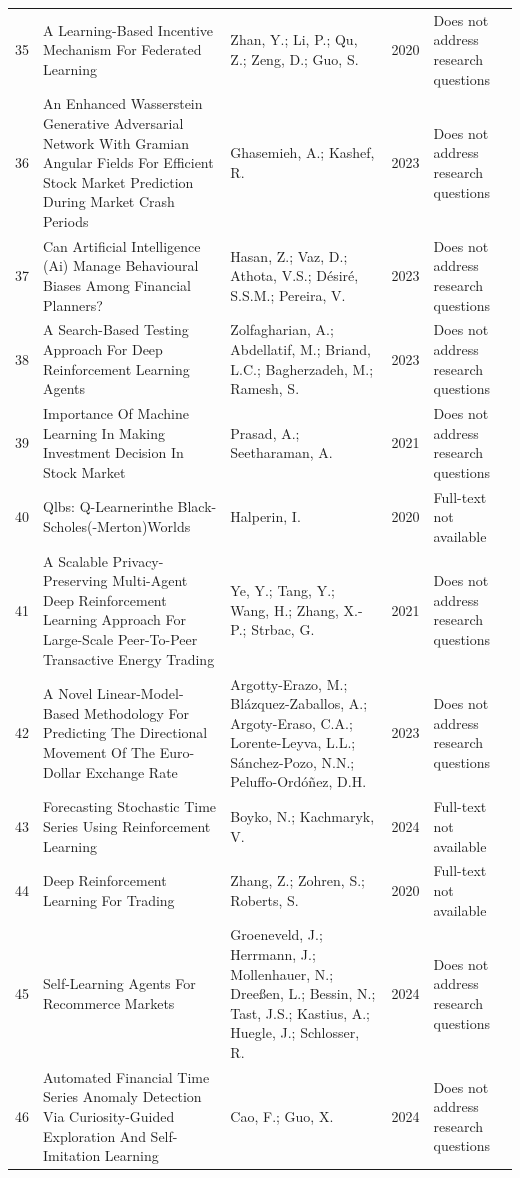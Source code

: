 \begin{small}
\begin{longtable}{r p{5cm} p{4cm} p{1cm} p{5cm}}
35 & A Learning-Based Incentive Mechanism For Federated Learning & Zhan, Y.; Li, P.; Qu, Z.; Zeng, D.; Guo, S. & 2020 & Does not address research questions \\
36 & An Enhanced Wasserstein Generative Adversarial Network With Gramian Angular Fields For Efficient Stock Market Prediction During Market Crash Periods & Ghasemieh, A.; Kashef, R. & 2023 & Does not address research questions \\
37 & Can Artificial Intelligence (Ai) Manage Behavioural Biases Among Financial Planners? & Hasan, Z.; Vaz, D.; Athota, V.S.; Désiré, S.S.M.; Pereira, V. & 2023 & Does not address research questions \\
38 & A Search-Based Testing Approach For Deep Reinforcement Learning Agents & Zolfagharian, A.; Abdellatif, M.; Briand, L.C.; Bagherzadeh, M.; Ramesh, S. & 2023 & Does not address research questions \\
39 & Importance Of Machine Learning In Making Investment Decision In Stock Market & Prasad, A.; Seetharaman, A. & 2021 & Does not address research questions \\
40 & Qlbs: Q-Learnerinthe Black-Scholes(-Merton)Worlds & Halperin, I. & 2020 & Full-text not available \\
41 & A Scalable Privacy-Preserving Multi-Agent Deep Reinforcement Learning Approach For Large-Scale Peer-To-Peer Transactive Energy Trading & Ye, Y.; Tang, Y.; Wang, H.; Zhang, X.-P.; Strbac, G. & 2021 & Does not address research questions \\
42 & A Novel Linear-Model-Based Methodology For Predicting The Directional Movement Of The Euro-Dollar Exchange Rate & Argotty-Erazo, M.; Blázquez-Zaballos, A.; Argoty-Eraso, C.A.; Lorente-Leyva, L.L.; Sánchez-Pozo, N.N.; Peluffo-Ordóñez, D.H. & 2023 & Does not address research questions \\
43 & Forecasting Stochastic Time Series Using Reinforcement Learning & Boyko, N.; Kachmaryk, V. & 2024 & Full-text not available \\
44 & Deep Reinforcement Learning For Trading & Zhang, Z.; Zohren, S.; Roberts, S. & 2020 & Full-text not available \\
45 & Self-Learning Agents For Recommerce Markets & Groeneveld, J.; Herrmann, J.; Mollenhauer, N.; Dreeßen, L.; Bessin, N.; Tast, J.S.; Kastius, A.; Huegle, J.; Schlosser, R. & 2024 & Does not address research questions \\
46 & Automated Financial Time Series Anomaly Detection Via Curiosity-Guided Exploration And Self-Imitation Learning & Cao, F.; Guo, X. & 2024 & Does not address research questions \\

\end{longtable}
\end{small}

